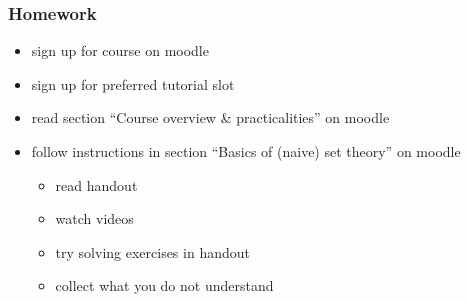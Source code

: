 \documentclass[fleqn,10pt,serif,xcolor=svgnames,xcolor=table,aspectratio=169,handout]{beamer}
\begin{document}
\begin{frame}
  \frametitle{Homework}

  \begin{itemize}
    \item sign up for course on moodle
    \item sign up for preferred tutorial slot
    \item read section ``Course overview \& practicalities'' on moodle
    \item follow instructions in section ``Basics of (naive) set theory'' on moodle
    \begin{itemize}
      \item read handout
      \item watch videos
      \item try solving exercises in handout
      \item collect what you do not understand
    \end{itemize}
  \end{itemize}

\end{frame}
\end{document}
